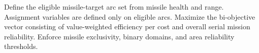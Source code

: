 Define the eligible missile-target arc set from missile health and range. Assignment variables are defined only on eligible arcs. Maximize the bi-objective vector consisting of value-weighted efficiency per cost and overall serial mission reliability. Enforce missile exclusivity, binary domains, and area reliability thresholds.
